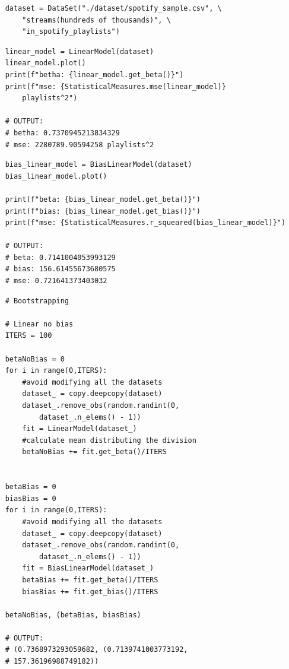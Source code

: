 \documentclass{report}
\begin{document}
    \subtitle{Carga del dataset}
    \begin{lstlisting}
    dataset = DataSet("./dataset/spotify_sample.csv", \
        "streams(hundreds of thousands)", \
        "in_spotify_playlists")
    \end{lstlisting}

    \subtitle{Grafica los datos superponiendo la linea en los datos que pasa por el origen. ¿Cual es el MSE?}
    \begin{lstlisting}
    linear_model = LinearModel(dataset)
    linear_model.plot()
    print(f"betha: {linear_model.get_beta()}")
    print(f"mse: {StatisticalMeasures.mse(linear_model)}
        playlists^2")

    # OUTPUT:
    # betha: 0.7370945213834329
    # mse: 2280789.90594258 playlists^2
    \end{lstlisting}

    \subtitle{Grafica los datos superponiendo la linea en los datos que no pasa por el origen. ¿Cual es el MSE?}
    \begin{lstlisting}
    bias_linear_model = BiasLinearModel(dataset)
    bias_linear_model.plot()

    print(f"beta: {bias_linear_model.get_beta()}")
    print(f"bias: {bias_linear_model.get_bias()}")
    print(f"mse: {StatisticalMeasures.r_squeared(bias_linear_model)}")

    # OUTPUT:
    # beta: 0.7141004053993129
    # bias: 156.61455673680575
    # mse: 0.721641373403032
    \end{lstlisting}

    \subtitle{Bootstrapping para el modelo lineal con y sin bias}
    \begin{lstlisting}
    # Bootstrapping

    # Linear no bias
    ITERS = 100

    betaNoBias = 0
    for i in range(0,ITERS):
        #avoid modifying all the datasets
        dataset_ = copy.deepcopy(dataset)
        dataset_.remove_obs(random.randint(0,
            dataset_.n_elems() - 1))
        fit = LinearModel(dataset_)
        #calculate mean distributing the division
        betaNoBias += fit.get_beta()/ITERS


    betaBias = 0
    biasBias = 0
    for i in range(0,ITERS):
        #avoid modifying all the datasets
        dataset_ = copy.deepcopy(dataset)
        dataset_.remove_obs(random.randint(0,
            dataset_.n_elems() - 1))
        fit = BiasLinearModel(dataset_)
        betaBias += fit.get_beta()/ITERS
        biasBias += fit.get_bias()/ITERS

    betaNoBias, (betaBias, biasBias)

    # OUTPUT:
    # (0.7368973293059682, (0.7139741003773192,
    # 157.36196988749182))
    \end{lstlisting}
\end{document}
